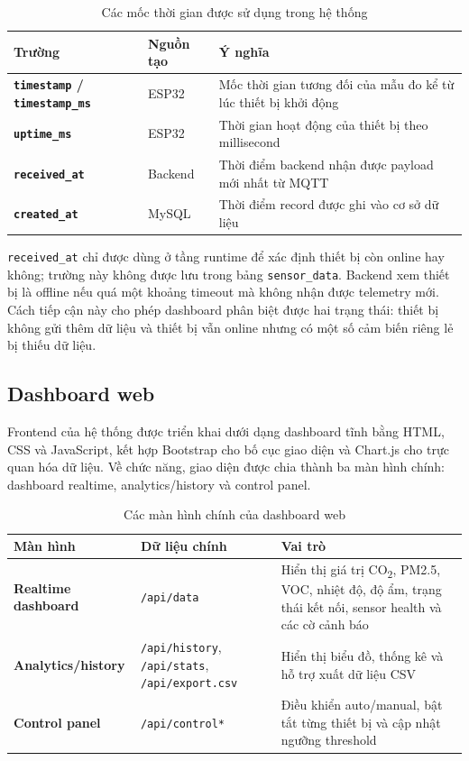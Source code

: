 \begin{table}[H]
    \centering
    \caption{Các mốc thời gian được sử dụng trong hệ thống}
    \begin{tabularx}{\textwidth}{>{\bfseries}l X X}
        \toprule
        Trường & Nguồn tạo & Ý nghĩa \\
        \midrule
        \texttt{timestamp} / \texttt{timestamp\_ms} & ESP32 & Mốc thời gian tương đối của mẫu đo kể từ lúc thiết bị khởi động \\
        \texttt{uptime\_ms} & ESP32 & Thời gian hoạt động của thiết bị theo millisecond \\
        \texttt{received\_at} & Backend & Thời điểm backend nhận được payload mới nhất từ MQTT \\
        \texttt{created\_at} & MySQL & Thời điểm record được ghi vào cơ sở dữ liệu \\
        \bottomrule
    \end{tabularx}
\end{table}

\texttt{received\_at} chỉ được dùng ở tầng runtime để xác định thiết bị còn online hay
không; trường này không được lưu trong bảng \texttt{sensor\_data}. Backend xem thiết bị
là offline nếu quá một khoảng timeout mà không nhận được telemetry mới. Cách tiếp cận
này cho phép dashboard phân biệt được hai trạng thái: thiết bị không gửi thêm dữ liệu và
thiết bị vẫn online nhưng có một số cảm biến riêng lẻ bị thiếu dữ liệu.

\subsection{Dashboard web}

Frontend của hệ thống được triển khai dưới dạng dashboard tĩnh bằng HTML, CSS và
JavaScript, kết hợp Bootstrap cho bố cục giao diện và Chart.js cho trực quan hóa dữ
liệu. Về chức năng, giao diện được chia thành ba màn hình chính: dashboard realtime,
analytics/history và control panel.

\begin{table}[H]
    \centering
    \caption{Các màn hình chính của dashboard web}
    \begin{tabularx}{\textwidth}{>{\bfseries}l X X}
        \toprule
        Màn hình & Dữ liệu chính & Vai trò \\
        \midrule
        Realtime dashboard & \texttt{/api/data} & Hiển thị giá trị CO\textsubscript{2}, PM2.5, VOC, nhiệt độ, độ ẩm, trạng thái kết nối, sensor health và các cờ cảnh báo \\
        Analytics/history & \texttt{/api/history}, \texttt{/api/stats}, \texttt{/api/export.csv} & Hiển thị biểu đồ, thống kê và hỗ trợ xuất dữ liệu CSV \\
        Control panel & \texttt{/api/control*} & Điều khiển auto/manual, bật tắt từng thiết bị và cập nhật ngưỡng threshold \\
        \bottomrule
    \end{tabularx}
\end{table}

